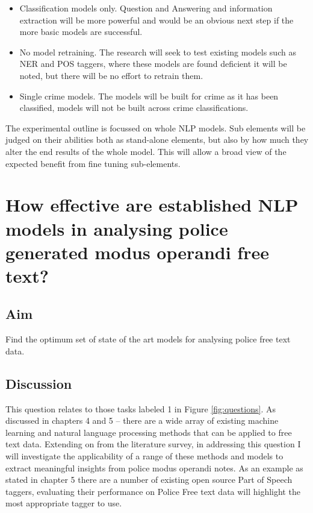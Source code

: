 \begin{itemize}

\item Classification models only. Question  and Answering and information extraction will be more powerful and would be an obvious next step if the more basic models are successful.

\item No model retraining. The research will seek to test existing models such as NER and POS taggers, where these models are found deficient it will be noted, but there will be no effort to retrain them.

\item Single crime models. The models will be built for crime as it has been classified, models will not be built across crime classifications.

\end{itemize}

The experimental outline is focussed on whole NLP models. Sub elements will be judged on their abilities both as stand-alone elements, but also by how much they alter the end results of the whole model. This will allow a broad view of the expected benefit from fine tuning sub-elements.


\section{How effective are established NLP models in analysing police generated modus operandi free text?}

\subsection{Aim} Find the optimum set of state of the art models for analysing police free text data.


\subsection{Discussion}

This question relates to those tasks labeled 1 in Figure \ref{fig:questions}. As discussed in chapters 4 and 5 – there are a wide array of existing machine learning and natural language processing methods that can be applied to free text data. Extending on from the literature survey, in addressing this question I will investigate the applicability of a range of these methods and models to extract meaningful insights from police modus operandi notes. As an example as stated in chapter 5 there are a number of existing open source Part of Speech taggers, evaluating their performance on Police Free text data will highlight the most appropriate tagger to use. 

